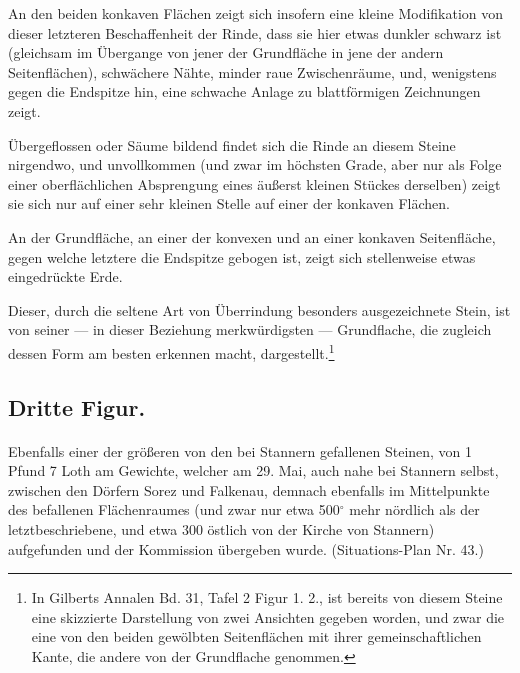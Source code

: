 \documentclass[a4paper, 11pt, oneside, german]{article}
\begin{document}
An den beiden konkaven Flächen zeigt sich insofern eine kleine Modifikation von dieser letzteren Beschaffenheit der Rinde, dass sie hier etwas dunkler schwarz ist (gleichsam im Übergange von jener der Grundfläche in jene der andern Seitenflächen), schwächere Nähte, minder raue Zwischenräume, und, wenigstens gegen die Endspitze hin, eine schwache Anlage zu blattförmigen Zeichnungen zeigt.

Übergeflossen oder Säume bildend findet sich die Rinde an diesem Steine nirgendwo, und unvollkommen (und zwar im höchsten Grade, aber nur als Folge einer oberflächlichen Absprengung eines äußerst kleinen Stückes derselben) zeigt sie sich nur auf einer sehr kleinen Stelle auf einer der konkaven Flächen.

An der Grundfläche, an einer der konvexen und an einer konkaven Seitenfläche, gegen welche letztere die Endspitze gebogen ist, zeigt sich stellenweise etwas eingedrückte Erde.

Dieser, durch die seltene Art von Überrindung besonders ausgezeichnete Stein, ist von seiner --- in dieser Beziehung merkwürdigsten --- Grundflache, die zugleich dessen Form am besten erkennen macht, dargestellt.\footnote{In Gilberts Annalen Bd. 31, Tafel 2 Figur 1. 2., ist bereits von diesem Steine eine skizzierte Darstellung von zwei Ansichten gegeben worden, und zwar die eine von den beiden gewölbten Seitenflächen mit ihrer gemeinschaftlichen Kante, die andere von der Grundflache genommen.}

\subsection{Dritte Figur.}
\paragraph{}
Ebenfalls einer der größeren von den bei Stannern gefallenen Steinen, von 1 Pfund 7 Loth am Gewichte, welcher am 29. Mai, auch nahe bei Stannern selbst, zwischen den Dörfern Sorez und Falkenau, demnach ebenfalls im Mittelpunkte des befallenen Flächenraumes (und zwar nur etwa 500$^{\circ}$ mehr nördlich als der letztbeschriebene, und etwa 300 östlich von der Kirche von Stannern) aufgefunden und der Kommission übergeben wurde. (Situations-Plan Nr. 43.)
\end{document}

